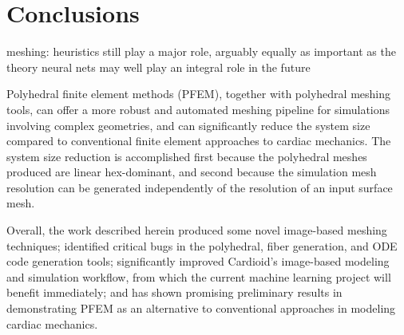 \chapter{Conclusions}
\label{chap:7}
%

meshing:
heuristics still play a major role, arguably equally as important as the theory
neural nets may well play an integral role in the future


Polyhedral finite element methods (PFEM), together with polyhedral meshing tools, can offer a more robust and automated meshing pipeline for simulations involving complex geometries, and can significantly reduce the system size compared to conventional finite element approaches to cardiac mechanics. The system size reduction is accomplished first because the polyhedral meshes produced are linear hex-dominant, and second because the simulation mesh resolution can be generated independently of the resolution of an input surface mesh.


Overall, the work described herein produced some novel image-based meshing techniques; identified critical bugs in the polyhedral, fiber generation, and ODE code generation tools; significantly improved Cardioid’s image-based modeling and simulation workflow, from which the current machine learning project will benefit immediately; and has shown promising preliminary results in demonstrating PFEM as an alternative to conventional approaches in modeling cardiac mechanics.